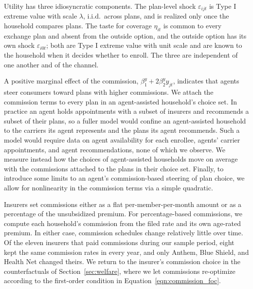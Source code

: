 \documentclass[12pt]{article}
\begin{document}
Utility has three idiosyncratic components. The plan-level shock $\varepsilon_{ijt}$ is Type I extreme value with scale $\lambda$, i.i.d.\ across plans, and is realized only once the household compares plans. The taste for coverage $\eta_{it}$ is common to every exchange plan and absent from the outside option, and the outside option has its own shock $\varepsilon_{i0t}$; both are Type I extreme value with unit scale and are known to the household when it decides whether to enroll. The three are independent of one another and of the channel.

A positive marginal effect of the commission, $\beta^{y}_{1} + 2\beta^{y}_{2} y_{jt}$, indicates that agents steer consumers toward plans with higher commissions. We attach the commission terms to every plan in an agent-assisted household's choice set. In practice an agent holds appointments with a subset of insurers and recommends a subset of their plans, so a fuller model would confine an agent-assisted household to the carriers its agent represents and the plans its agent recommends. Such a model would require data on agent availability for each enrollee, agents' carrier appointments, and agent recommendations, none of which we observe. We measure instead how the choices of agent-assisted households move on average with the commissions attached to the plans in their choice set. Finally, to introduce some limits to an agent's commission-based steering of plan choice, we allow for nonlinearity in the commission terms via a simple quadratic.

Insurers set commissions either as a flat per-member-per-month amount or as a percentage of the unsubsidized premium. For percentage-based commissions, we compute each household's commission from the filed rate and its own age-rated premium. In either case, commission schedules change relatively little over time. Of the eleven insurers that paid commissions during our sample period, eight kept the same commission rates in every year, and only Anthem, Blue Shield, and Health Net changed theirs. We return to the insurer's commission choice in the counterfactuals of Section~\ref{sec:welfare}, where we let commissions re-optimize according to the first-order condition in Equation~\eqref{eqn:commission_foc}.
\end{document}
